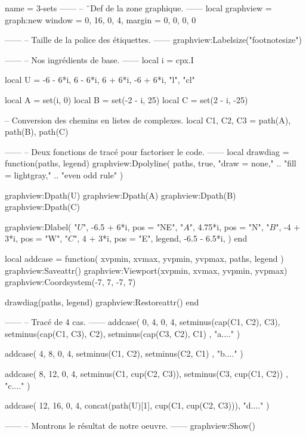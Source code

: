 \documentclass{standalone}
\begin{document}
\begin{luadraw}{name = 3-sets}
------
-- ¨Def de la zone graphique.
------
local graphview = graph:new{
  window = {0, 16, 0, 4},
  margin = {0, 0, 0, 0}
}

------
-- Taille de la police des étiquettes.
------
graphview:Labelsize("footnotesize")

------
-- Nos ingrédients de base.
------
local i = cpx.I

local U = {
  -6 - 6*i, 6 - 6*i, 6 + 6*i, -6 + 6*i,
  "l",
  "cl"
}

local A = set(i, 0)
local B = set(-2 - i, 25)
local C = set(2 - i, -25)

-- Conversion des chemins en listes de complexes.
local C1, C2, C3 = path(A), path(B), path(C)

------
-- Deux fonctions de tracé pour factoriser le code.
------
local drawdiag = function(paths, legend)
  graphview:Dpolyline(
    paths,
    true,
       "draw = none,"
    .. "fill = lightgray,"
    .. "even odd rule"
  )

  graphview:Dpath(U)
  graphview:Dpath(A)
  graphview:Dpath(B)
  graphview:Dpath(C)

  graphview:Dlabel(
    "$U$", -6.5 + 6*i, {pos = "NE"},
    "$A$", 4.75*i, {pos = "N"},
    "$B$", -4 + 3*i, {pos = "W"},
    "$C$", 4 + 3*i, {pos = "E"},
    legend, -6.5 - 6.5*i, {}
  )
end

local addcase = function(
    xvpmin, xvmax, yvpmin, yvpmax,
    paths,
    legend
)
  graphview:Saveattr()
    graphview:Viewport(xvpmin, xvmax, yvpmin, yvpmax)
    graphview:Coordsystem(-7, 7, -7, 7)

    drawdiag(paths, legend)
  graphview:Restoreattr()
end

------
-- Tracé de 4 cas.
------
addcase(
  0, 4, 0, 4,
  {
    setminus(cap(C1, C2), C3),
    setminus(cap(C1, C3), C2),
    setminus(cap(C3, C2), C1)
  },
  "a...."
)

addcase(
  4, 8, 0, 4,
  {
    setminus(C1, C2),
    setminus(C2, C1)
  },
  "b...."
)

addcase(
  8, 12, 0, 4,
  {
    setminus(C1, cup(C2, C3)),
    setminus(C3, cup(C1, C2))
  },
  "c...."
)

addcase(
  12, 16, 0, 4,
  concat(path(U)[1], cup(C1, cup(C2, C3))),
  "d...."
)

------
-- Montrons le résultat de notre oeuvre.
------
graphview:Show()
\end{luadraw}
\end{document}
